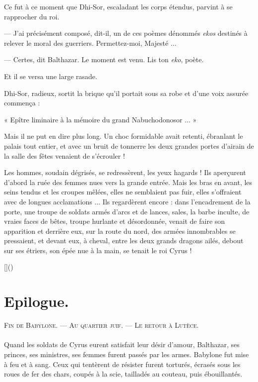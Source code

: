 \documentclass[a4paper, 11pt, oneside, polutonikogreek, french]{article}
\begin{document}
\bigskip
\centerline{\EightStarTaper}
\centerline{\EightStarTaper\EightStarTaper}
\bigskip

Ce fut à ce moment que Dhi-Sor, escaladant les corps étendus, parvint à se rapprocher du roi.

--- J'ai précisément composé, dit-il, un de ces poèmes dénommés \emph{ekos} destinés à relever le moral des guerriers. Permettez-moi, Majesté ...

--- Certes, dit Balthazar. Le moment est venu. Lis ton \emph{eko}, poète.

Et il se versa une large rasade.

Dhi-Sor, radieux, sortit la brique qu'il portait sous sa robe et d'une voix assurée commença :

« Epître liminaire à la mémoire du grand Nabuchodonosor ... »

Mais il ne put en dire plus long. Un choc formidable avait retenti, ébranlant le palais tout entier, et avec un bruit de tonnerre les deux grandes portes d'airain de la salle des fêtes venaient de s'écrouler !

Les hommes, soudain dégrisés, se redressèrent, les yeux hagards ! Ils aperçurent d'abord la ruée des femmes nues vers la grande entrée. Mais les bras en avant, les seins tendus et les croupes mêlées, elles ne semblaient pas fuir, elles s'offraient avec de longues acclamations ... Ils regardèrent encore : dans l'encadrement de la porte, une troupe de soldats armés d'arcs et de lances, sales, la barbe inculte, de vraies faces de bêtes, troupe hurlante et désordonnée, venait de faire son apparition et derrière eux, sur la route du nord, des armées innombrables se pressaient, et devant eux, à cheval, entre les deux grands dragons ailés, debout sur ses étriers, son épée nue à la main, se tenait le roi Cyrus !

\bigskip
\centerline{\EightStarTaper}
\centerline{\EightStarTaper\EightStarTaper}
\bigskip

[]()
\clearpage
\section{Epilogue.}
\begin{center}
\scshape
\small
Fin de Babylone. --- Au quartier juif. --- Le retour à Lutèce.
\end{center}
\paragraph{}
Quand les soldats de Cyrus eurent satisfait leur désir d'amour, Balthazar, ses princes, ses ministres, ses femmes furent passés par les armes. Babylone fut mise à feu et à sang. Ceux qui tentèrent de résister furent torturés, écrasés sous les roues de fer des chars, coupés à la scie, tailladés au couteau, puis ébouillantés.
\end{document}
